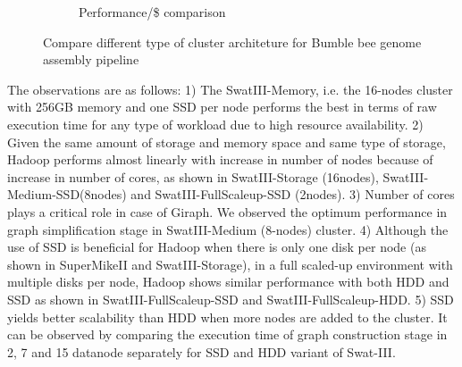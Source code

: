 \documentclass[conference]{IEEEtran}
\begin{document}
\begin{figure}[h]
\begin{subfigure}[b]{0.23\textwidth}
                \caption{Performance/\$ comparison}
                \label{fig:DifferentArchitecturesPerfPerDollar}
        \end{subfigure}
        \caption{Compare different type of cluster architeture for Bumble bee genome assembly pipeline}
  \label{fig:DifferentArchitectures}
\end{figure}
The observations are as follows:
1) The SwatIII-Memory, i.e. the 16-nodes cluster with 256GB memory and one SSD per node performs the best in terms of raw execution time for any type of workload due to high resource availability.
2) Given the same amount of storage and memory space and same type of storage, Hadoop performs almost linearly with increase in number of nodes because of increase in number of cores, as shown in SwatIII-Storage (16nodes), SwatIII-Medium-SSD(8nodes) and SwatIII-FullScaleup-SSD (2nodes).
3) Number of cores plays a critical role in case of Giraph. We observed the optimum performance in graph simplification stage in SwatIII-Medium (8-nodes) cluster.
4) Although the use of SSD is beneficial for Hadoop when there is only one disk per node (as shown in SuperMikeII and SwatIII-Storage), in a full scaled-up environment with multiple disks per node, Hadoop shows similar performance with both HDD and SSD as shown in SwatIII-FullScaleup-SSD and SwatIII-FullScaleup-HDD.
5) SSD yields better scalability than HDD when more nodes are added to the cluster. It can be observed by comparing the execution time of graph construction stage in 2, 7 and 15 datanode separately for SSD and HDD variant of Swat-III. 
\end{document}
